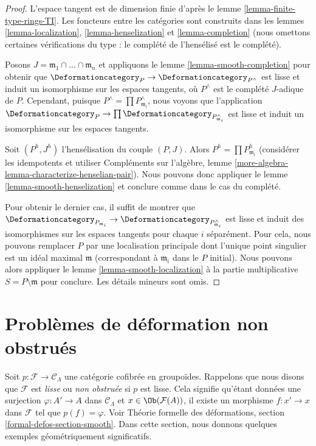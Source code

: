 \begin{proof}
L'espace tangent est de dimension finie d'après le
lemme \ref{lemma-finite-type-rings-TI}.
Les foncteurs entre les catégories sont construits
dans les lemmes \ref{lemma-localization}, \ref{lemma-henselization} et
\ref{lemma-completion} (nous omettons certaines vérifications du type :
le complété de l'hensélisé est le complété).

\medskip\noindent
Posons $J = \mathfrak m_1 \cap \ldots \cap \mathfrak m_n$ et appliquons le
lemme \ref{lemma-smooth-completion} pour obtenir que
$\Deformationcategory_P \to \Deformationcategory_{P^\wedge}$
est lisse et induit un isomorphisme sur les espaces tangents,
où $P^\wedge$ est le complété $J$-adique de $P$.
Cependant, puisque $P^\wedge = \prod P_{\mathfrak m_i}^\wedge$,
nous voyons que l'application $\Deformationcategory_P \to
\prod \Deformationcategory_{P_{\mathfrak m_i}^\wedge}$
est lisse et induit un isomorphisme sur les espaces tangents.

\medskip\noindent
Soit $(P^h, J^h)$ l'hensélisation du couple $(P, J)$.
Alors $P^h = \prod P_{\mathfrak m_i}^h$ (considérer les idempotents
et utiliser Compléments sur l'algèbre, lemme
\ref{more-algebra-lemma-characterize-henselian-pair}).
Nous pouvons donc appliquer le lemme \ref{lemma-smooth-henselization}
et conclure comme dans le cas du complété.

\medskip\noindent
Pour obtenir le dernier cas, il suffit de montrer que
$\Deformationcategory_{P_{\mathfrak m_i}} \to
\Deformationcategory_{P_{\mathfrak m_i}^\wedge}$
est lisse et induit des isomorphismes sur les espaces tangents pour chaque $i$ séparément.
Pour cela, nous pouvons remplacer $P$ par une localisation principale
dont l'unique point singulier est un idéal maximal $\mathfrak m$
(correspondant à $\mathfrak m_i$ dans le $P$ initial).
Nous pouvons alors appliquer le
lemme \ref{lemma-smooth-localization}
à la partie multiplicative $S = P \setminus \mathfrak m$ pour conclure.
Les détails mineurs sont omis.
\end{proof}






\section{Problèmes de déformation non obstrués}
\label{section-unobstructed}

\noindent
Soit $p : \mathcal{F} \to \mathcal{C}_\Lambda$ une
catégorie cofibrée en groupoïdes. Rappelons que nous disons que $\mathcal{F}$
est {\it lisse} ou {\it non obstruée} si $p$ est lisse.
Cela signifie qu'étant données une surjection $\varphi : A' \to A$ dans
$\mathcal{C}_\Lambda$ et $x \in \Ob(\mathcal{F}(A))$,
il existe un morphisme $f : x' \to x$ dans $\mathcal{F}$
tel que $p(f) = \varphi$.
Voir Théorie formelle des déformations, section \ref{formal-defos-section-smooth}.
Dans cette section, nous donnons quelques exemples géométriquement significatifs.

